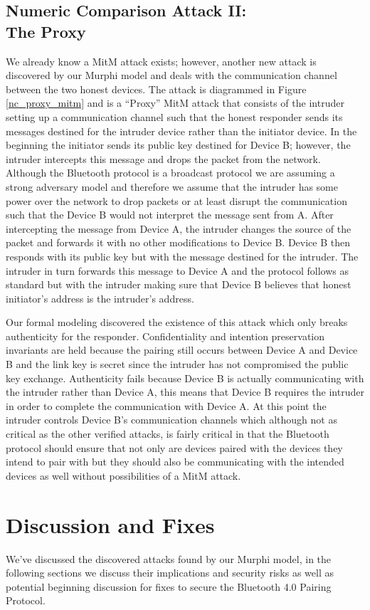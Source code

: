 \documentclass{acm_proc_article-sp}
\begin{document}
\subsection{Numeric Comparison Attack II:\\The Proxy}
We already know a MitM attack exists; however, another new attack is discovered by our Murphi model and deals with the communication channel between the two honest devices. The attack is diagrammed in Figure \ref{nc_proxy_mitm} and is a ``Proxy'' MitM attack that consists of the intruder setting up a communication channel such that the honest responder sends its messages destined for the intruder device rather than the initiator device. In the beginning the initiator sends its public key destined for Device B; however, the intruder intercepts this message and drops the packet from the network. Although the Bluetooth protocol is a broadcast protocol we are assuming a strong adversary model and therefore we assume that the intruder has some power over the network to drop packets or at least disrupt the communication such that the Device B would not interpret the message sent from A. After intercepting the message from Device A, the intruder changes the source of the packet and forwards it with no other modifications to Device B. Device B then responds with its public key but with the message destined for the intruder. The intruder in turn forwards this message to Device A and the protocol follows as standard but with the intruder making sure that Device B believes that honest initiator's address is the intruder's address.

Our formal modeling discovered the existence of this attack which only breaks authenticity for the responder. Confidentiality and intention preservation invariants are held because the pairing still occurs between Device A and Device B and the link key is secret since the intruder has not compromised the public key exchange. Authenticity fails because Device B is actually communicating with the intruder rather than Device A, this means that Device B requires the intruder in order to complete the communication with Device A. At this point the intruder controls Device B's communication channels which although not as critical as the other verified attacks, is fairly critical in that the Bluetooth protocol should ensure that not only are devices paired with the devices they intend to pair with but they should also be communicating with the intended devices as well without possibilities of a MitM attack.

\section{Discussion and Fixes}
We've discussed the discovered attacks found by our Murphi model, in the following sections we discuss their implications and security risks as well as potential beginning discussion for fixes to secure the Bluetooth 4.0 Pairing Protocol.
\end{document}

